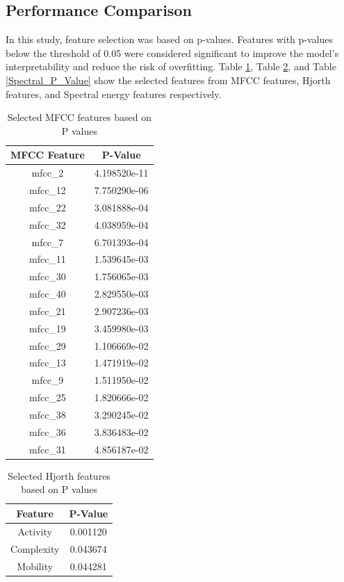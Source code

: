 \documentclass[applsci,article,accept,moreauthors,pdftex]{Definitions/mdpi}
\begin{document}
\subsection{Performance Comparison}

In this study, feature selection was based on p-values. Features with p-values below the threshold of 0.05 were considered significant to improve the model’s interpretability and reduce the risk of overfitting. Table \ref{MFCC_P_Value}, Table \ref{Hjorth_P_Value}, and Table \ref{Spectral_P_Value} show the selected features from MFCC features, Hjorth features, and Spectral energy features respectively. \\


\begin{table}[t!]
\centering
\begin{tabular}{|c|c|}
\hline
\textbf{MFCC Feature} & \textbf{P-Value} \\
\hline
mfcc\_2 & 4.198520e-11 \\
\hline
mfcc\_12 & 7.750290e-06 \\
\hline
mfcc\_22 & 3.081888e-04 \\
\hline
mfcc\_32 & 4.038959e-04 \\
\hline
mfcc\_7 & 6.701393e-04 \\
\hline
mfcc\_11 & 1.539645e-03 \\
\hline
mfcc\_30 & 1.756065e-03 \\
\hline
mfcc\_40 & 2.829550e-03 \\
\hline
mfcc\_21 & 2.907236e-03 \\
\hline
mfcc\_19 & 3.459980e-03 \\
\hline
mfcc\_29 & 1.106669e-02 \\
\hline
mfcc\_13 & 1.471919e-02 \\
\hline
mfcc\_9 & 1.511950e-02 \\
\hline
mfcc\_25 & 1.820666e-02 \\
\hline
mfcc\_38 & 3.290245e-02 \\
\hline
mfcc\_36 & 3.836483e-02 \\
\hline
mfcc\_31 & 4.856187e-02 \\
\hline
\end{tabular}
\caption{Selected MFCC features based on P values}
\label{MFCC_P_Value}
\end{table}



\begin{table}[t!]
\centering
\begin{tabular}{|c|c|}
\hline
\textbf{Feature} & \textbf{P-Value} \\
\hline
Activity & 0.001120 \\
\hline
Complexity & 0.043674 \\
\hline
Mobility & 0.044281 \\
\hline
\end{tabular}
\caption{Selected Hjorth features based on P values}
\label{Hjorth_P_Value}
\end{table}
\end{document}
